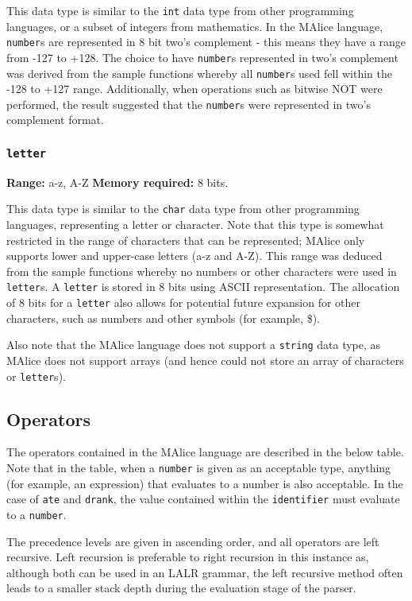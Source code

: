 \documentclass[a4wide, 10pt]{article}
\newcommand{\tab}{\hspace*{2em}}
\begin{document}
\tab This data type is similar to the \texttt{int} data type from other 
programming languages, or a subset of integers from mathematics. In the MAlice 
language, \texttt{number}s are represented in 8 bit two's complement - this
means they have a range from -127 to +128. The choice to have \texttt{number}s
represented in two's complement was derived from the sample functions whereby
all \texttt{number}s used fell within the -128 to +127 range. Additionally, when
operations such as bitwise NOT were performed, the result suggested that the 
\texttt{number}s were represented in two's complement format.

\subsubsection{\texttt{letter}}

{\bf Range:} a-z, A-Z {\bf Memory required:} 8 bits.

\tab This data type is similar to the \texttt{char} data type from other
programming languages, representing a letter or character. Note that this type
is somewhat restricted in the range of characters that can be represented; 
MAlice only supports lower and upper-case letters (a-z and A-Z). This range was 
deduced from the sample functions whereby no numbers or other characters were 
used in \texttt{letter}s. A \texttt{letter} is stored in 8 bits using ASCII 
representation. The allocation of 8 bits for a \texttt{letter} also allows for
potential future expansion for other characters, such as numbers and other 
symbols (for example, \$).

Also note that the MAlice language does not support a \texttt{string} data 
type, as MAlice does not support arrays (and hence could not store an array of
characters or \texttt{letter}s).

\subsection{Operators}
The operators contained in the MAlice language are described in the below table.
Note that in the table, when a \texttt{number} is given as an acceptable type,
anything (for example, an expression) that evaluates to a number is also
acceptable. In the case of \texttt{ate} and \texttt{drank}, the value contained
within the \texttt{identifier} must evaluate to a \texttt{number}.

The precedence levels are given in ascending order, and all operators are left
recursive. Left recursion is preferable to right recursion in this instance as,
although both can be used in an LALR grammar, the left recursive method often
leads to a smaller stack depth during the evaluation stage of the parser.
\cite{eac}
\end{document}
